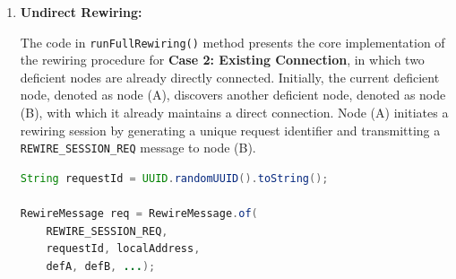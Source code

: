 \begin{enumerate}
\begin{lstlisting}[language=Java,
    caption={Direct Rewiring},
    label={lst:direct_rewiring}]
    RewireMessage response = null;
    try {
        response = sendAsync(defB, request)
            .get(REQUEST_TIMEOUT.toMillis(),
                TimeUnit.MILLISECONDS);
    } catch (InterruptedException
        | ExecutionException
        | TimeoutException e) {
        Console.logError("[REWIRE] An unexpected error has occured " + e.getMessage());    
        return false;
    }

    if (response == null || response.status()
            != RewireStatus.ACCEPTED) {
        Console.log("[REWIRE] response is null or not ACCEPTED");
        return false;
    }

    boolean localApplied = connectionManager
        .addIfSpace(defB,
            "direct rewiring recovery commit");

    if (!localApplied) {
        Console.log("[REWIRE] Local applied failed");
        return false;
    }

    RewireMessage commit = RewireMessage.of(
        RecoveryMessageType.REWIRE_DIRECT_COMMIT,
        recoveryId, localAddress,
        defA, defB, null, null, defB, null,
        connectionManager.neighborAddresses(),
        List.of(), RewireStatus.ACCEPTED);

    sendOnly(defB, commit);
    refreshHealthState();
    Console.logSuccess("Direct Repait completed successfully");
    return true;
}
\end{lstlisting}

  \item{\textbf{Undirect Rewiring: }}

        The code in \texttt{runFullRewiring()} method presents the core implementation of the rewiring procedure for
        \textbf{Case 2: Existing Connection}, in which two deficient nodes are already directly connected. Initially, the
        current deficient node, denoted as node (A), discovers another deficient node, denoted as node (B), with which it
        already maintains a direct connection. Node (A) initiates a rewiring session by generating a unique request identifier
        and transmitting a \texttt{REWIRE\_SESSION\_REQ} message to node (B).

        \begin{lstlisting}[language=Java,
    caption={Generating Session ID},
    label={lst:sessionId}]
String requestId = UUID.randomUUID().toString();

RewireMessage req = RewireMessage.of(
    REWIRE_SESSION_REQ,
    requestId, localAddress,
    defA, defB, ...);


\end{lstlisting}
\end{enumerate}
